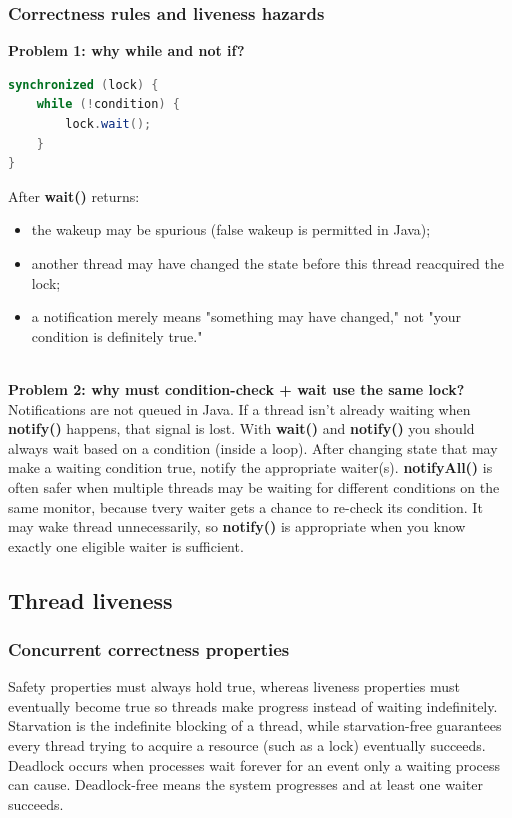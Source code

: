 \documentclass[11pt]{article}
\begin{document}
\subsubsection{Correctness rules and liveness hazards}
\textbf{Problem 1: why while and not if?}
\begin{lstlisting}[language=Java]
synchronized (lock) {
    while (!condition) {
        lock.wait();
    }
}
\end{lstlisting}
After \textbf{wait()} returns:
\begin{itemize}
    \item the wakeup may be spurious (false wakeup is permitted in Java);
    \item another thread may have changed the state before this thread reacquired the lock;
    \item a notification merely means "something may have changed," not "your condition is definitely true."
\end{itemize}
$\quad$\\[-1em]
\textbf{Problem 2: why must condition-check + wait use the same lock?} \\
Notifications are not queued in Java. If a thread isn't already waiting when \textbf{notify()} happens, that signal is lost.
With \textbf{wait()} and \textbf{notify()} you should always wait based on a condition (inside a loop). After changing state that may make a waiting condition true, notify the appropriate waiter(s).
\textbf{notifyAll()} is often safer when multiple threads may be waiting for different conditions on the same monitor, because tvery waiter gets a chance to re-check its condition.
It may wake thread unnecessarily, so \textbf{notify()} is appropriate when you know exactly one eligible waiter is sufficient.

\subsection{Thread liveness}
\subsubsection{Concurrent correctness properties}
Safety properties must always hold true, whereas liveness properties must eventually become true so threads make progress instead of waiting indefinitely.
Starvation is the indefinite blocking of a thread, while starvation-free guarantees every thread trying to acquire a resource (such as a lock) eventually succeeds.
Deadlock occurs when processes wait forever for an event only a waiting process can cause. Deadlock-free means the system progresses and at least one waiter succeeds.
\end{document}
